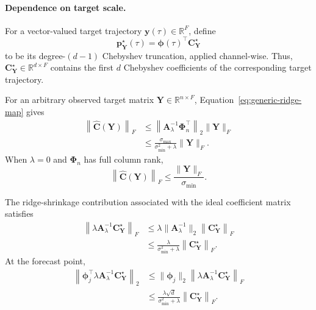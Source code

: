 \paragraph{Dependence on target scale.}
For a vector-valued target trajectory
$\mathbf{y}(\tau)\in\mathbb{R}^{F}$, define
\begin{equation}
\mathbf{p}_{\mathbf{Y}}^\star(\tau)
=
\boldsymbol{\phi}(\tau)^\top
\mathbf{C}_{\mathbf{Y}}^\star
\label{eq:generic-chebyshev-truncation}
\end{equation}
to be its degree-$(d-1)$ Chebyshev truncation, applied channel-wise.
Thus,
$\mathbf{C}_{\mathbf{Y}}^\star\in\mathbb{R}^{d\times F}$
contains the first $d$ Chebyshev coefficients of the corresponding
target trajectory.

For an arbitrary observed target matrix
$\mathbf{Y}\in\mathbb{R}^{n\times F}$,
Equation~\eqref{eq:generic-ridge-map} gives
\begin{align}
\left\|
\widehat{\mathbf{C}}(\mathbf{Y})
\right\|_F
&\leq
\left\|
\mathbf{A}_\lambda^{-1}
\mathbf{\Phi}_n^\top
\right\|_2
\|\mathbf{Y}\|_F
\nonumber\\
&\leq
\frac{
\sigma_{\max}
}{
\sigma_{\min}^2+\lambda
}
\|\mathbf{Y}\|_F.
\label{eq:target-scale-coefficient-bound}
\end{align}
When $\lambda=0$ and $\mathbf{\Phi}_n$ has full column rank,
\begin{equation}
\left\|
\widehat{\mathbf{C}}(\mathbf{Y})
\right\|_F
\leq
\frac{
\|\mathbf{Y}\|_F
}{
\sigma_{\min}
}.
\label{eq:unregularized-target-scale-bound}
\end{equation}

The ridge-shrinkage contribution associated with the ideal coefficient
matrix satisfies
\begin{align}
\left\|
\lambda
\mathbf{A}_\lambda^{-1}
\mathbf{C}_{\mathbf{Y}}^\star
\right\|_F
&\leq
\lambda
\|\mathbf{A}_\lambda^{-1}\|_2
\left\|
\mathbf{C}_{\mathbf{Y}}^\star
\right\|_F
\nonumber\\
&\leq
\frac{
\lambda
}{
\sigma_{\min}^2+\lambda
}
\left\|
\mathbf{C}_{\mathbf{Y}}^\star
\right\|_F.
\label{eq:target-scale-coefficient-bias}
\end{align}
At the forecast point,
\begin{align}
\left\|
\boldsymbol{\phi}_j^\top
\lambda
\mathbf{A}_\lambda^{-1}
\mathbf{C}_{\mathbf{Y}}^\star
\right\|_2
&\leq
\|\boldsymbol{\phi}_j\|_2
\left\|
\lambda
\mathbf{A}_\lambda^{-1}
\mathbf{C}_{\mathbf{Y}}^\star
\right\|_F
\nonumber\\
&\leq
\frac{
\lambda\sqrt{d}
}{
\sigma_{\min}^2+\lambda
}
\left\|
\mathbf{C}_{\mathbf{Y}}^\star
\right\|_F.
\label{eq:target-scale-bias-bound}
\end{align}

